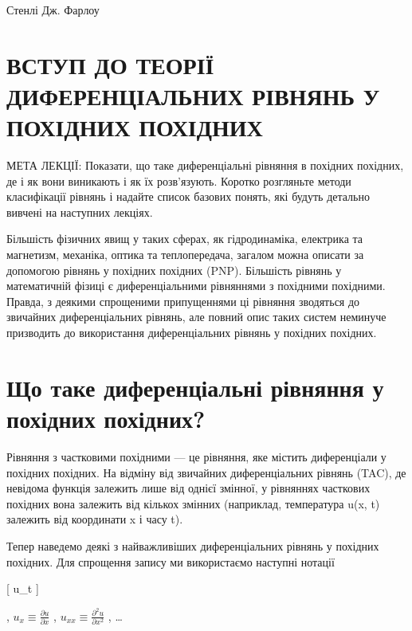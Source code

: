 \documentclass[
  ukrainian,
]{article}
\begin{document}
Стенлі Дж. Фарлоу

\section{ВСТУП ДО ТЕОРІЇ ДИФЕРЕНЦІАЛЬНИХ РІВНЯНЬ У ПОХІДНИХ
ПОХІДНИХ}\label{ux432ux441ux442ux443ux43f-ux434ux43e-ux442ux435ux43eux440ux456ux457-ux434ux438ux444ux435ux440ux435ux43dux446ux456ux430ux43bux44cux43dux438ux445-ux440ux456ux432ux43dux44fux43dux44c-ux443-ux43fux43eux445ux456ux434ux43dux438ux445-ux43fux43eux445ux456ux434ux43dux438ux445}

МЕТА ЛЕКЦІЇ: Показати, що таке диференціальні рівняння в похідних
похідних, де і як вони виникають і як їх розв'язують. Коротко розгляньте
методи класифікації рівнянь і надайте список базових понять, які будуть
детально вивчені на наступних лекціях.

Більшість фізичних явищ у таких сферах, як гідродинаміка, електрика та
магнетизм, механіка, оптика та теплопередача, загалом можна описати за
допомогою рівнянь у похідних похідних (PNP). Більшість рівнянь у
математичній фізиці є диференціальними рівняннями з похідними похідними.
Правда, з деякими спрощеними припущеннями ці рівняння зводяться до
звичайних диференціальних рівнянь, але повний опис таких систем неминуче
призводить до використання диференціальних рівнянь у похідних похідних.

\section{Що таке диференціальні рівняння у похідних
похідних?}\label{ux449ux43e-ux442ux430ux43aux435-ux434ux438ux444ux435ux440ux435ux43dux446ux456ux430ux43bux44cux43dux456-ux440ux456ux432ux43dux44fux43dux43dux44f-ux443-ux43fux43eux445ux456ux434ux43dux438ux445-ux43fux43eux445ux456ux434ux43dux438ux445}

Рівняння з частковими похідними --- це рівняння, яке містить
диференціали у похідних похідних. На відміну від звичайних
диференціальних рівнянь (TAC), де невідома функція залежить лише від
однієї змінної, у рівняннях часткових похідних вона залежить від кількох
змінних (наприклад, температура u(x, t) залежить від координати x і часу
t).

Тепер наведемо деякі з найважливіших диференціальних рівнянь у похідних
похідних. Для спрощення запису ми використаємо наступні нотації

{[} u\_t \equiv {} {]}

, \(u_x \equiv \frac{\partial u}{\partial x}\) ,
\(u_{xx} \equiv \frac{\partial^2 u}{\partial x^2}\) , \ldots{}
\end{document}
